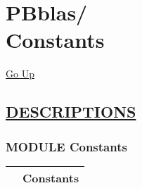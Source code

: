 \chapter*{\color{headfile}
{\large PBblas\slash\hspace{0pt}}
 \\
Constants
}
\hypertarget{ecldoc:toc:PBblas.Constants}{}
\hyperlink{ecldoc:toc:root/PBblas}{Go Up}


\section*{\underline{\textsf{DESCRIPTIONS}}}
\subsection*{\textsf{\colorbox{headtoc}{\color{white} MODULE}
Constants}}

\hypertarget{ecldoc:PBblas.Constants}{}

{\renewcommand{\arraystretch}{1.5}
\begin{tabularx}{\textwidth}{|>{\raggedright\arraybackslash}l|X|}
\hline
\hspace{0pt}\mytexttt{\color{red} } & \textbf{Constants} \\
\hline
\end{tabularx}
}

\par


